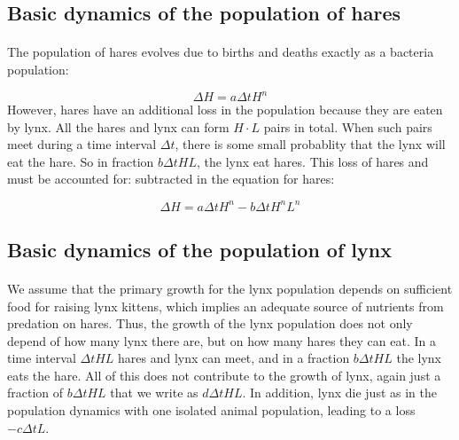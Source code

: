 \documentclass[%
twoside,                 %
final,                   %
10pt]{article}
\begin{document}
\noindent



\subsection*{Basic dynamics of the population of hares}


\paragraph{}
The population of hares evolves due to births and deaths exactly as a bacteria population:

\[
\Delta H = a \Delta t H^n
\]
However, hares have an additional loss in the population because
they are eaten by lynx.
All the hares and lynx can form
$H\cdot L$ pairs in total. When such pairs meet during a time
interval $\Delta t$, there is some
small probablity that the lynx will eat the hare.
So in fraction $b\Delta t HL$, the lynx eat hares. This
loss of hares and must be accounted for:
subtracted in the equation for hares:

\[ \Delta H = a\Delta t H^n - b \Delta t H^nL^n\]



\subsection*{Basic dynamics of the population of lynx}


\paragraph{}
We assume that the primary growth for the lynx population depends on sufficient food for raising lynx kittens, which implies an adequate source of nutrients from predation on hares. Thus, the growth of the lynx population does not only depend of how many lynx there are, but on how many hares they can eat.
In a time interval $\Delta t HL$ hares and lynx can meet, and in a
fraction $b\Delta t HL$ the lynx eats the hare. All of this does not
contribute to the growth of lynx, again just a fraction of
$b\Delta t HL$ that we write as
$d\Delta t HL$. In addition, lynx die just as in the population
dynamics with one isolated animal population, leading to a loss
$-c\Delta t L$.
\end{document}
